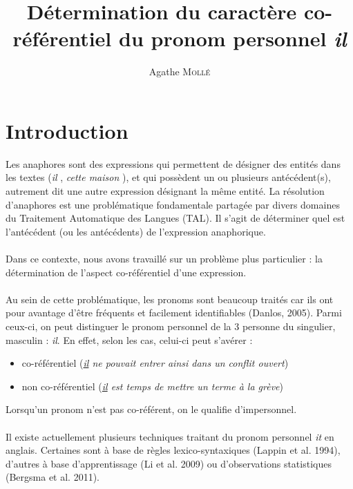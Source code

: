 \documentclass[a4paper,12pt]{article}
\title{Détermination du caractère co-référentiel du pronom personnel \og{}\textit{il}\fg{}}
\author{Agathe \textsc{Mollé}}
\begin{document}
\maketitle

\begin{abstract}
\end{abstract}

\section*{Introduction}

Les anaphores sont des expressions qui permettent de désigner des entités dans les textes (\og \textit{il} \fg{}, \og \textit{cette maison} \fg{}), et qui possèdent un ou plusieurs antécédent(s), autrement dit une autre expression désignant la même entité. La résolution  d'anaphores est une problématique fondamentale partagée par divers domaines du Traitement Automatique des Langues (TAL). Il s'agit de déterminer quel est l'antécédent (ou les antécédents) de l'expression anaphorique.

\paragraph{}
Dans ce contexte, nous avons travaillé sur un problème plus particulier : la détermination de l'aspect co-référentiel d'une expression.

\paragraph{}
Au sein de cette problématique, les pronoms sont beaucoup traités car ils ont pour avantage d'être fréquents et facilement identifiables (Danlos, 2005). 
Parmi ceux-ci, on peut distinguer le pronom personnel de la 3 personne du singulier, masculin : \og{}\textit{il}\fg{}. 
En effet, selon les cas, celui-ci peut s'avérer : 
\begin{itemize}
 \item co-référentiel (\og{}\textit{\underline{il} ne pouvait entrer ainsi dans un conflit ouvert}\fg{})
 \item non co-référentiel (\og{}\textit{\underline{il} est temps de mettre un terme à la grève}\fg{})
\end{itemize}
Lorsqu'un pronom n'est pas co-référent, on le qualifie d'impersonnel.

\paragraph{}
Il existe actuellement plusieurs techniques traitant du pronom personnel \og{}\textit{it}\fg{} en anglais.
Certaines sont à base de règles lexico-syntaxiques (Lappin et al. 1994), d'autres à base d'apprentissage (Li et al. 2009) ou d'observations statistiques (Bergsma et al. 2011).
\end{document}
